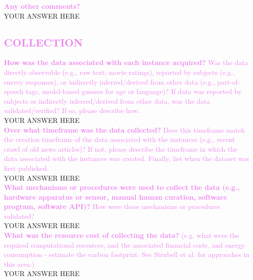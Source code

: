 \documentclass[letterpaper, 10 pt, conference]{ieeeconf}
\newcommand{\sectioncolor}{violet}
\begin{document}
    \textcolor{\sectioncolor}{\textbf{
    Any other comments?
    }} \\
    YOUR ANSWER HERE \\

\begin{mdframed}[linecolor=\sectioncolor]
\section*{\textcolor{\sectioncolor}{
    COLLECTION
}}
\end{mdframed}

    \textcolor{\sectioncolor}{\textbf{
    How was the data associated with each instance acquired?
    }
    Was the data directly observable (e.g., raw text, movie ratings),
    reported by subjects (e.g., survey responses), or indirectly
    inferred/derived from other data (e.g., part-of-speech tags, model-based
    guesses for age or language)? If data was reported by subjects or
    indirectly inferred/derived from other data, was the data
    validated/verified? If so, please describe how.
    } \\
    YOUR ANSWER HERE \\
    
    \textcolor{\sectioncolor}{\textbf{
    Over what timeframe was the data collected?
    }
    Does this timeframe match the creation timeframe of the data associated
    with the instances (e.g., recent crawl of old news articles)? If not,
    please describe the timeframe in which the data associated with the
    instances was created. Finally, list when the dataset was first published.
    } \\
    YOUR ANSWER HERE \\
    
    \textcolor{\sectioncolor}{\textbf{
    What mechanisms or procedures were used to collect the data (e.g., hardware
    apparatus or sensor, manual human curation, software program, software
    API)?
    }
    How were these mechanisms or procedures validated?
    } \\
    YOUR ANSWER HERE \\
    
    \textcolor{\sectioncolor}{\textbf{
    What was the resource cost of collecting the data?
    }
    (e.g. what were the required computational resources, and the associated
    financial costs, and energy consumption - estimate the carbon footprint.
    See Strubell et al. for approaches in this area.)
    } \\
    YOUR ANSWER HERE \\
    
\end{document}
